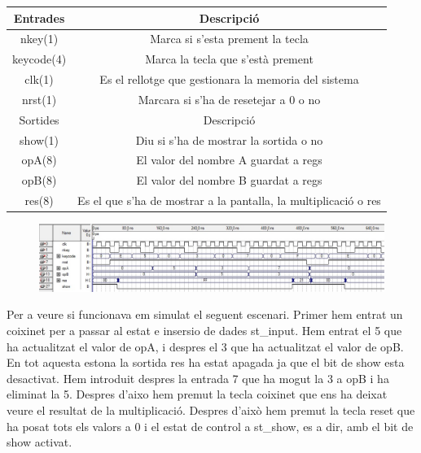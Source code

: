 \documentclass[12pt, a4papre]{article}
\begin{document}
	\begin{table}[H]
		\centering
		 \begin{tabular}{|c | c|} 
			 \hline
			 Entrades & Descripció\\ [0.5ex] 
			 \hline
			 nkey(1) &  Marca si s'esta prement la tecla \\ 
			 keycode(4) & Marca la tecla que s'està prement \\
			 clk(1) & Es el rellotge que gestionara la memoria del sistema  \\
			 nrst(1) & Marcara si s'ha de resetejar a 0 o no \\ [1ex] 
			 \hline\hline
			 Sortides & Descripció\\ [0.5ex] 
			 \hline
			 show(1) & Diu si s'ha de mostrar la sortida o no\\ 
			 opA(8) & El valor del nombre A guardat a regs\\
			 opB(8) & El valor del nombre B guardat a regs\\
			 res(8) & Es el que s'ha de mostrar a la pantalla, la multiplicació o res\\ [1ex] 
			 \hline
		 \end{tabular}
	\end{table}
	
	\begin{figure}[H]
		\begin{center}
		\includegraphics[width=130mm]{SimPpal.jpeg}
		\end{center}
	\end{figure}
	
	Per a veure si funcionava em simulat el seguent escenari. Primer hem entrat un coixinet per a passar al estat e insersio de dades st\_input. Hem entrat el 5 que ha actualitzat el valor de opA, i despres el 3 que ha actualitzat el valor de opB. En tot aquesta estona la sortida res ha estat apagada ja que el bit de show esta desactivat. Hem introduit despres la entrada 7 que ha mogut la 3 a opB i ha eliminat la 5. Despres d'aixo hem premut la tecla coixinet que ens ha deixat veure el resultat de la multiplicació. Despres d'això hem premut la tecla reset que ha posat tots els valors a 0 i el estat de control a st\_show, es a dir, amb el bit de show activat.
	
\end{document}
